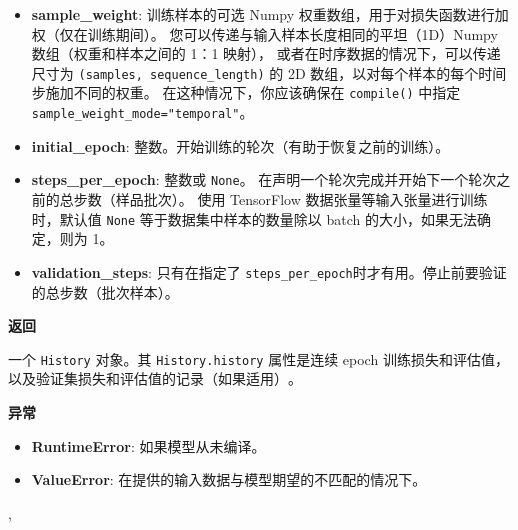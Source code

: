 \begin{itemize}
\item
  \textbf{sample\_weight}: 训练样本的可选 Numpy
  权重数组，用于对损失函数进行加权（仅在训练期间）。
  您可以传递与输入样本长度相同的平坦（1D）Numpy 数组（权重和样本之间的
  1：1 映射）， 或者在时序数据的情况下，可以传递尺寸为
  \texttt{(samples,\ sequence\_length)} 的 2D
  数组，以对每个样本的每个时间步施加不同的权重。
  在这种情况下，你应该确保在 \texttt{compile()} 中指定
  \texttt{sample\_weight\_mode="temporal"}。
\item
  \textbf{initial\_epoch}:
  整数。开始训练的轮次（有助于恢复之前的训练）。
\item
  \textbf{steps\_per\_epoch}: 整数或 \texttt{None}。
  在声明一个轮次完成并开始下一个轮次之前的总步数（样品批次）。 使用
  TensorFlow 数据张量等输入张量进行训练时，默认值 \texttt{None}
  等于数据集中样本的数量除以 batch 的大小，如果无法确定，则为 1。
\item
  \textbf{validation\_steps}: 只有在指定了
  \texttt{steps\_per\_epoch}时才有用。停止前要验证的总步数（批次样本）。
\end{itemize}

\textbf{返回}

一个 \texttt{History} 对象。其 \texttt{History.history} 属性是连续 epoch
训练损失和评估值，以及验证集损失和评估值的记录（如果适用）​​。

\textbf{异常}

\begin{itemize}
\tightlist
\item
  \textbf{RuntimeError}: 如果模型从未编译。
\item
  \textbf{ValueError}: 在提供的输入数据与模型期望的不匹配的情况下。
\end{itemize}



\label{evaluate}

\begin{Shaded}
\begin{Highlighting}[]
\OperatorTok{=}\OperatorTok{=}\OperatorTok{=}\OperatorTok{=}\OperatorTok{=}, \\
\hspace{1cm}\OperatorTok{=}\NormalTok{)}
\end{Highlighting}
\end{Shaded}

